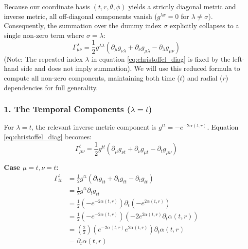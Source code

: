 \documentclass[11pt, a4paper]{report}
\begin{document}
Because our coordinate basis $(t, r, \theta, \phi)$ yields a strictly diagonal metric and inverse metric, all off-diagonal components vanish ($g^{\lambda\sigma} = 0$ for $\lambda \neq \sigma$). Consequently, the summation over the dummy index $\sigma$ explicitly collapses to a single non-zero term where $\sigma = \lambda$:
\begin{equation}
    \Gamma^\lambda_{\mu\nu} = \frac{1}{2} g^{\lambda\lambda} (\partial_\mu g_{\nu\lambda} + \partial_\nu g_{\mu\lambda} - \partial_\lambda g_{\mu\nu}) \label{eq:christoffel_diag}
\end{equation}
(Note: The repeated index $\lambda$ in equation \eqref{eq:christoffel_diag} is fixed by the left-hand side and does not imply summation). We will use this reduced formula to compute all non-zero components, maintaining both time ($t$) and radial ($r$) dependencies for full generality.

\subsubsection*{1. The Temporal Components ($\lambda = t$)}

For $\lambda = t$, the relevant inverse metric component is $g^{tt} = -e^{-2\alpha(t,r)}$. 
Equation \eqref{eq:christoffel_diag} becomes:
\begin{equation}
    \Gamma^t_{\mu\nu} = \frac{1}{2} g^{tt} (\partial_\mu g_{\nu t} + \partial_\nu g_{\mu t} - \partial_t g_{\mu\nu}) \label{eq:gamma_t_general}
\end{equation}

\textbf{Case $\mu = t, \nu = t$:}
\begin{align}
    \Gamma^t_{tt} &= \frac{1}{2} g^{tt} (\partial_t g_{tt} + \partial_t g_{tt} - \partial_t g_{tt}) \nonumber \\
    &= \frac{1}{2} g^{tt} \partial_t g_{tt} \nonumber \\
    &= \frac{1}{2} \left( -e^{-2\alpha(t,r)} \right) \partial_t \left( -e^{2\alpha(t,r)} \right) \nonumber \\
    &= \frac{1}{2} \left( -e^{-2\alpha(t,r)} \right) \left( -2 e^{2\alpha(t,r)} \partial_t \alpha(t,r) \right) \nonumber \\
    &= \left( \frac{2}{2} \right) \left( e^{-2\alpha(t,r)} e^{2\alpha(t,r)} \right) \partial_t \alpha(t,r) \nonumber \\
    &= \partial_t \alpha(t,r)
\end{align}
\end{document}
